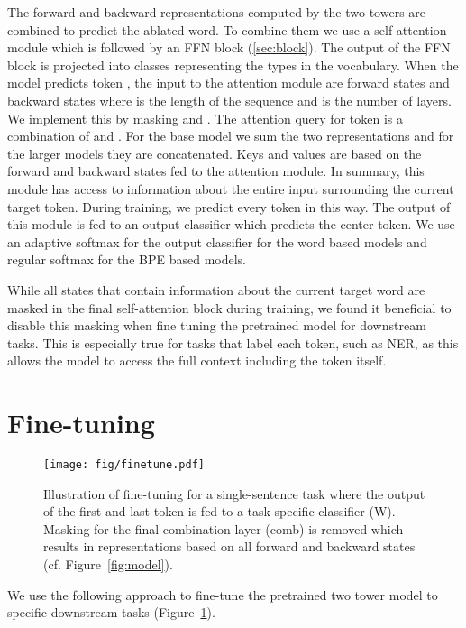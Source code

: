 \documentclass[11pt,a4paper]{article}
\begin{document}
The forward and backward representations computed by the two towers are combined to predict the ablated word.
To combine them we use a self-attention module which is followed by an FFN block (\textsection\ref{sec:block}).
The output of the FFN block is projected into  classes representing the types in the vocabulary. 
When the model predicts token , the input to the attention module are forward states  and backward states  where  is the length of the sequence and  is the number of layers.
We implement this by masking  and .
The attention query for token  is a combination of  and .
For the base model we sum the two representations and for the larger models they are concatenated.
Keys and values are based on the forward and backward states fed to the attention module.
In summary, this module has access to information about the entire input surrounding the current target token.
During training, we predict every token in this way.
The output of this module is fed to an output classifier which predicts the center token. 
We use an adaptive softmax for the output classifier \citep{grave2017icml} for the word based models and regular softmax for the BPE based models.

While all states that contain information about the current target word are masked in the final self-attention block during training, we found it beneficial to disable this masking when fine tuning the pretrained model for downstream tasks. 
This is especially true for tasks that label each token, such as NER, as this allows the model to access the full context including the token itself.


\section{Fine-tuning}

\begin{figure}[t]
\centering
\texttt{[image: fig/finetune.pdf]}
\caption{Illustration of fine-tuning for a single-sentence task where the output of the first and last token is fed to a task-specific classifier (W).
Masking for the final combination layer (comb) is removed which results in representations based on all forward and backward states (cf. Figure~\ref{fig:model}).
}
\label{fig:finetune}
\end{figure}

We use the following approach to fine-tune the pretrained two tower model to specific downstream tasks (Figure~\ref{fig:finetune}).
\end{document}
